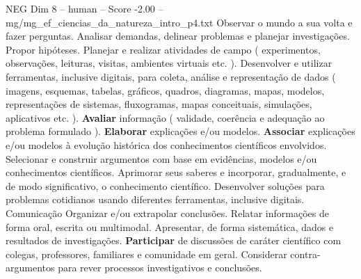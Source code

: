 \begin{textsample}{NEG Dim 8 – human – Score -2.00 – mg/mg\_ef\_ciencias\_da\_natureza\_intro\_p4.txt}  \label{ex:f8_neg_009}
Observar o mundo a sua volta e fazer perguntas.
Analisar demandas, delinear problemas e planejar investigações.
Propor hipóteses.
Planejar e realizar atividades de campo ( experimentos, observações, leituras, visitas, ambientes virtuais etc. ).
Desenvolver e utilizar ferramentas, inclusive digitais, para coleta, análise e representação de dados ( imagens, esquemas, tabelas, gráficos, quadros, diagramas, mapas, modelos, representações de sistemas, fluxogramas, mapas conceituais, simulações, aplicativos etc. ). \textbf{Avaliar} informação ( validade, coerência e adequação ao problema formulado ). \textbf{Elaborar} explicações e/ou modelos. \textbf{Associar} explicações e/ou modelos à evolução histórica dos conhecimentos científicos envolvidos.
Selecionar e construir argumentos com base em evidências, modelos e/ou conhecimentos científicos.
Aprimorar seus saberes e incorporar, gradualmente, e de modo significativo, o conhecimento científico.
Desenvolver soluções para problemas cotidianos usando diferentes ferramentas, inclusive digitais.
Comunicação Organizar e/ou extrapolar conclusões.
Relatar informações de forma oral, escrita ou multimodal.
Apresentar, de forma sistemática, dados e resultados de investigações. \textbf{Participar} de discussões de caráter científico com colegas, professores, familiares e comunidade em geral.
Considerar contra-argumentos para rever processos investigativos e conclusões.

\end{textsample}
